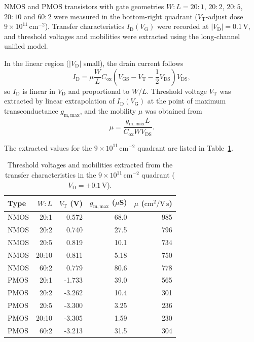 NMOS and PMOS transistors with gate geometries $W:L = 20\!:\!1$, $20\!:\!2$, $20\!:\!5$, $20\!:\!10$ and $60\!:\!2$ were measured in the bottom-right quadrant ($V_\mathrm{T}$-adjust dose $9\times10^{11}\,\mathrm{cm}^{-2}$). Transfer characteristics $I_\mathrm{D}(V_\mathrm{G})$ were recorded at $|V_\mathrm{D}| = 0.1$\,V, and threshold voltages and mobilities were extracted using the long-channel unified model.

In the linear region ($|V_\mathrm{D}|$ small), the drain current follows
\[
  I_\mathrm{D} = \mu \frac{W}{L} C_\mathrm{ox} \left( V_\mathrm{GS} - V_\mathrm{T} - \frac{1}{2}V_\mathrm{DS} \right) V_\mathrm{DS},
\]
so $I_\mathrm{D}$ is linear in $V_\mathrm{D}$ and proportional to $W/L$. Threshold voltage $V_\mathrm{T}$ was extracted by linear extrapolation of $I_\mathrm{D}(V_\mathrm{G})$ at the point of maximum transconductance $g_\mathrm{m,max}$, and the mobility $\mu$ was obtained from
\[
  \mu = \frac{g_\mathrm{m,max}L}{C_\mathrm{ox}WV_\mathrm{DS}}.
\]

The extracted values for the $9\times10^{11}\,\mathrm{cm}^{-2}$ quadrant are listed in Table~\ref{tab:ch7-transfers}.

\begin{table}[htbp]
  \centering
  \caption{Threshold voltages and mobilities extracted from the transfer characteristics in the $9\times10^{11}\,\mathrm{cm}^{-2}$ quadrant ($V_\mathrm{D} = \pm 0.1$\,V).}
  \label{tab:ch7-transfers}
  \begin{tabular}{lrrrr}
    \toprule
    Type & $W:L$ & $V_\mathrm{T}$ (V) & $g_\mathrm{m,max}$ ($\mu$S) & $\mu$ ($\mathrm{cm}^2/\mathrm{V\,s}$) \\
    \midrule
    NMOS & 20:1  &  0.572 & 68.0  & 985 \\
    NMOS & 20:2  &  0.740 & 27.5  & 796 \\
    NMOS & 20:5  &  0.819 & 10.1  & 734 \\
    NMOS & 20:10 &  0.811 & 5.18  & 750 \\
    NMOS & 60:2  &  0.779 & 80.6  & 778 \\
    \midrule
    PMOS & 20:1  & -1.733 & 39.0  & 565 \\
    PMOS & 20:2  & -3.262 & 10.4  & 301 \\
    PMOS & 20:5  & -3.300 & 3.25  & 236 \\
    PMOS & 20:10 & -3.305 & 1.59  & 230 \\
    PMOS & 60:2  & -3.213 & 31.5  & 304 \\
    \bottomrule
  \end{tabular}
\end{table}

